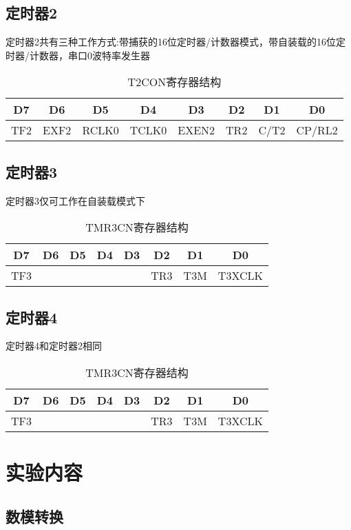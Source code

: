 \documentclass{article}
\begin{document}
\begin{CJK}{UTF8}{gkai}
\subsection{定时器2}
定时器2共有三种工作方式:带捕获的16位定时器/计数器模式，带自装载的16位定时器/计数器，串口0波特率发生器
\begin{table}[!htbp]
  \centering
  \caption{T2CON寄存器结构}
  \begin{tabular}{|c|c|c|c|c|c|c|c|}
    \hline
    D7&D6&D5&D4&D3&D2&D1&D0\\
		  \hline
    TF2&EXF2&RCLK0&TCLK0&EXEN2&TR2&C/T2&CP/RL2\\
		  \hline
    \hline
  \end{tabular}

\end{table}

\subsection{定时器3}
定时器3仅可工作在自装载模式下
\begin{table}[!htbp]
  \centering
  \caption{TMR3CN寄存器结构}
  \begin{tabular}{|c|c|c|c|c|c|c|c|}
    \hline
    D7&D6&D5&D4&D3&D2&D1&D0\\
		  \hline
    TF3&&&&&TR3&T3M&T3XCLK\\
    \hline
  \end{tabular}

\end{table}

\subsection{定时器4}
定时器4和定时器2相同
\begin{table}[!htbp]
  \centering
  \caption{TMR3CN寄存器结构}
  \begin{tabular}{|c|c|c|c|c|c|c|c|}
    \hline
    D7&D6&D5&D4&D3&D2&D1&D0\\
		  \hline
    TF3&&&&&TR3&T3M&T3XCLK\\
		  \hline
    \hline
  \end{tabular}

\end{table}
\section{实验内容}
\subsection{数模转换}
	

\end{CJK}
\end{document}
